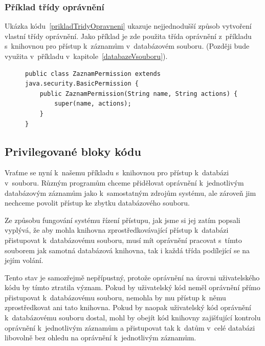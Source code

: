 \subsubsection{Příklad třídy oprávnění} \label{zaznamPerm}

Ukázka kódu~\ref{prikladTridyOpravneni} ukazuje nejjednodušší způsob vytvoření vlastní třídy oprávnění. Jako příklad je zde použita třída oprávnění z~příkladu s~knihovnou pro přístup k~záznamům v~databázovém souboru. (Později bude využita v~příkladu v~kapitole~\ref{databazeVsouboru}).

\begin{figure}[tbh]
\begin{lstlisting}[caption=Demonstrační třída oprávnění, label=prikladTridyOpravneni]
public class ZaznamPermission extends java.security.BasicPermission {
    public ZaznamPermission(String name, String actions) {
        super(name, actions);
    }
}
\end{lstlisting}
\end{figure}

\subsection{Privilegované bloky kódu}\label{privilegovaneBloky}

Vraťme se nyní k~našemu příkladu s~knihovnou pro přístup k~databázi v~souboru. Různým programům chceme přidělovat oprávnění k~jednotlivým databázovým záznamům jako k~samostatným zdrojům systému, ale zároveň jim nechceme povolit přístup ke zbytku databázového souboru.

Ze způsobu fungování systému řízení přístupu, jak jsme si jej zatím popsali vyplývá, že aby mohla knihovna zprostředkovávající přístup k~databázi přistupovat k~databázovému souboru, musí mít oprávnění pracovat s~tímto souborem jak samotná databázová knihovna, tak i každá třída podílející se na jejím volání.

Tento stav je samozřejmě nepřípustný, protože oprávnění na úrovni uživatelského kódu by tímto ztratila význam. Pokud by uživatelský kód neměl oprávnění přímo přistupovat k~databázovému souboru, nemohla by mu přístup k~němu zprostředkovat ani tato knihovna. Pokud by naopak uživatelský kód oprávnění k~databázovému souboru dostal, mohl by obejít kód knihovny zajišťující kontrolu oprávnění k~jednotlivým záznamům a přistupovat tak k~datům v~celé databázi libovolně bez ohledu na oprávnění k~jednotlivým záznamům.

